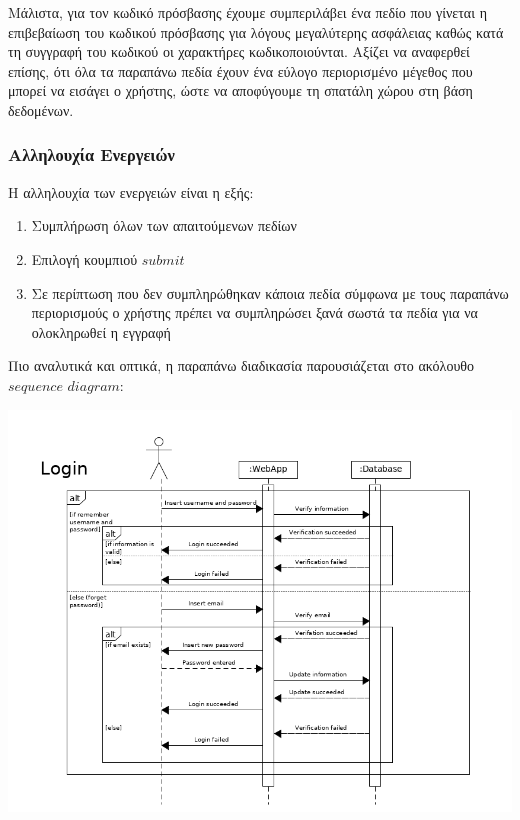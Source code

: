 \documentclass[12pt]{article}
\begin{document}
Μάλιστα, για τον κωδικό πρόσβασης έχουμε συμπεριλάβει ένα πεδίο που γίνεται η επιβεβαίωση του κωδικού πρόσβασης για λόγους μεγαλύτερης ασφάλειας καθώς κατά τη συγγραφή του κωδικού οι χαρακτήρες κωδικοποιούνται. Αξίζει να αναφερθεί επίσης, ότι όλα τα παραπάνω πεδία έχουν ένα εύλογο περιορισμένο μέγεθος που μπορεί να εισάγει ο χρήστης, ώστε να αποφύγουμε τη σπατάλη χώρου στη βάση δεδομένων.

\subsubsection{Αλληλουχία Ενεργειών}

Η αλληλουχία των ενεργειών είναι η εξής:

\begin{enumerate}
\item Συμπλήρωση όλων των απαιτούμενων πεδίων
\item Επιλογή κουμπιού $submit$
\item Σε περίπτωση που δεν συμπληρώθηκαν κάποια πεδία σύμφωνα με τους παραπάνω περιορισμούς ο χρήστης πρέπει να συμπληρώσει ξανά σωστά τα πεδία για να ολοκληρωθεί η εγγραφή
\end{enumerate}

Πιο αναλυτικά και οπτικά, η παραπάνω διαδικασία παρουσιάζεται στο ακόλουθο $sequence$ $diagram$:


\begin{center}
\includegraphics[scale=0.5]{UML/loginSequence.png}
\end{center}
\end{document}
